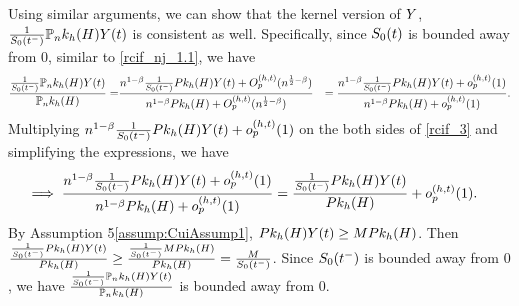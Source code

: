 {Using similar arguments, we can show that the kernel version of $Y$,  $\frac{1}{S_0(t^-)}\mathbb{P}_nk_h(H)Y(t)$ is consistent as well. Specifically, since $S_0(t)$ is bounded away from $0$, similar to \cref{rcif_nj_1.1}, we have
\begin{align*}
\frac{\frac{1}{\truesurv\argtleft}\PnkH\atrisk\argt}{\PnkH} = &\frac{\tmprateinv \frac{1}{\truesurv\argtleft}\PkH\atrisk\argt + \Ophtsqrtnbeta}{\denomlong}%
&=\frac{\tmprateinv\frac{1}{\truesurv\argtleft}\PkH\atrisk\argt+\opht}{\tmprateinv\PkH+\opht}. %
\end{align*}
Multiplying $n^{1-\beta} \frac{1}{S_0(t^-)}Pk_h(H)Y(t) + o_p^{(h, t)}(1)$ on the both sides of \cref{rcif_3} and simplifying the expressions, we have
\begin{align*}
\implies \frac{\tmprateinv \frac{1}{\truesurv\argtleft}\PkH\atrisk\argt + \opht}{\tmprateinv \PkH + \opht} %
&=\frac{\frac{1}{\truesurv\argtleft}\PkH\atrisk\argt}{\PkH} + \opht.
\end{align*}
By Assumption \ifnum{} 5\else \ref{assump:CuiAssump1}\fi, $Pk_h(H)Y(t) \ge M Pk_h(H)$. Then $\frac{\frac{1}{S_0(t^-)}Pk_h(H)Y(t)}{Pk_h(H)} \ge \frac{\frac{1}{S_0(t^-)}M Pk_h(H)}{Pk_h(H)} = \frac{M}{S_0(t^-)}$. Since $S_0(t^-)$ is bounded away from $0$, we have $\frac{\frac{1}{S_0(t^-)}\mathbb{P}_nk_h(H)Y(t)}{\mathbb{P}_nk_h(H)}$ is bounded away from $0$.
} %

